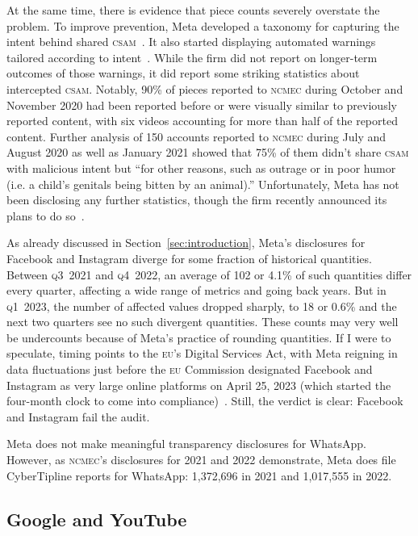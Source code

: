 \documentclass[nonacm,screen]{acmart}
\newcommand\V[1]{\textsc{\MakeLowercase{#1}}}
\begin{document}
At the same time, there is evidence that piece counts severely overstate the
problem. To improve prevention, Meta developed a taxonomy for capturing the
intent behind shared \V{CSAM}~\cite{BuckleyAndrusea2021}. It also started
displaying automated warnings tailored according to intent~\cite{Davis2021}.
While the firm did not report on longer-term outcomes of those warnings, it did
report some striking statistics about intercepted \V{CSAM}. Notably, 90\% of
pieces reported to \V{NCMEC} during October and November 2020 had been reported
before or were visually similar to previously reported content, with six videos
accounting for more than half of the reported content. Further analysis of 150
accounts reported to \V{NCMEC} during July and August 2020 as well as January
2021 showed that 75\% of them didn't share \V{CSAM} with malicious intent but
``for other reasons, such as outrage or in poor humor (i.e. a child's genitals
being bitten by an animal).'' Unfortunately, Meta has not been disclosing any
further statistics, though the firm recently announced its plans to do
so~\cite{Meta2023}.

As already discussed in Section~\ref{sec:introduction}, Meta's disclosures for
Facebook and Instagram diverge for some fraction of historical quantities.
Between \V{Q3}~2021 and \V{Q4}~2022, an average of 102 or 4.1\% of such
quantities differ every quarter, affecting a wide range of metrics and going
back years. But in \V{Q1}~2023, the number of affected values dropped sharply,
to 18 or 0.6\% and the next two quarters see no such divergent quantities. These
counts may very well be undercounts because of Meta's practice of rounding
quantities. If I were to speculate, timing points to the \V{EU}'s Digital
Services Act, with Meta reigning in data fluctuations just before the \V{EU}
Commission designated Facebook and Instagram as very large online platforms on
April 25, 2023 (which started the four-month clock to come into
compliance)~\cite{EuropeanCommission2023a}. Still, the verdict is clear:
Facebook and Instagram fail the audit.

Meta does not make meaningful transparency disclosures for WhatsApp. However, as
\V{NCMEC}'s disclosures for 2021 and 2022 demonstrate, Meta does file
CyberTipline reports for WhatsApp: 1,372,696 in 2021 and 1,017,555 in 2022.


\subsection{Google and YouTube}
\end{document}
